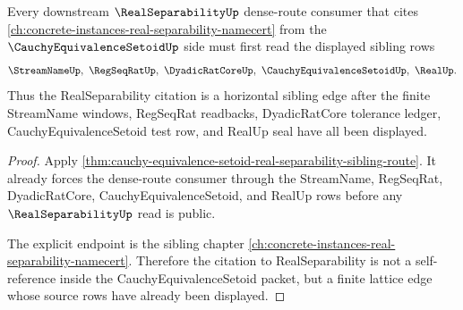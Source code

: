 \begin{theorem}
\label{thm:cauchy-equivalence-setoid-real-separability-forward-lattice-repair}
Every downstream $\RealSeparabilityUp$ dense-route consumer that cites \autoref{ch:concrete-instances-real-separability-namecert} from the $\CauchyEquivalenceSetoidUp$ side must first read the displayed sibling rows
$$
\StreamNameUp,\ \RegSeqRatUp,\ \DyadicRatCoreUp,\ \CauchyEquivalenceSetoidUp,\ \RealUp .
$$
Thus the RealSeparability citation is a horizontal sibling edge after the finite StreamName windows, RegSeqRat readbacks, DyadicRatCore tolerance ledger, CauchyEquivalenceSetoid test row, and RealUp seal have all been displayed.
\end{theorem}
\begin{proof}
Apply \autoref{thm:cauchy-equivalence-setoid-real-separability-sibling-route}. It already forces the dense-route consumer through the StreamName, RegSeqRat, DyadicRatCore, CauchyEquivalenceSetoid, and RealUp rows before any $\RealSeparabilityUp$ read is public.

The explicit endpoint is the sibling chapter \autoref{ch:concrete-instances-real-separability-namecert}. Therefore the citation to RealSeparability is not a self-reference inside the CauchyEquivalenceSetoid packet, but a finite lattice edge whose source rows have already been displayed.
\end{proof}
